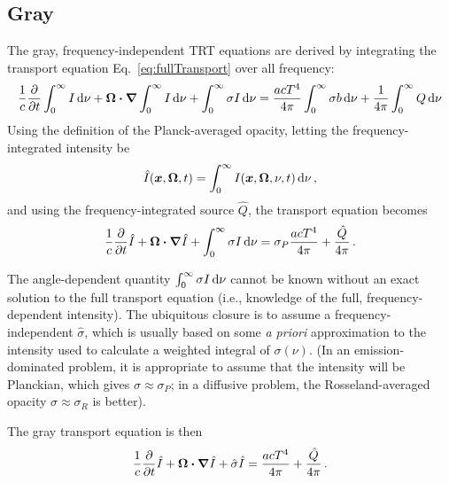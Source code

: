 \documentclass[11pt]{SRJresearch}
\begin{document}
\subsection{Gray}
The gray, frequency-independent TRT equations are derived by integrating the
transport equation Eq.~\eqref{eq:fullTransport} over all frequency:
\begin{equation*}
  \frac{1}{c} \frac{\partial }{\partial t} \int_{0}^{\infty} I \mathop{}\!\mathrm{d} \nu
  + \bm{\Omega} \bm{\cdot} \bm{\nabla} \int_{0}^{\infty}  I \mathop{}\!\mathrm{d} \nu +
  \int_{0}^{\infty} \sigma I \mathop{}\!\mathrm{d} \nu
  = \frac{a c T^4}{4\pi} \int_{0}^{\infty}  \sigma b  \mathop{}\!\mathrm{d} \nu
  + \frac{1}{4\pi} \int_{0}^{\infty} Q \mathop{}\!\mathrm{d} \nu
\end{equation*}
Using the definition of the Planck-averaged opacity, letting the
frequency-integrated intensity be
\begin{equation*}
  \hat I(\bm{x}, \bm{\Omega}, t) = \int_{0}^{\infty}  I(\bm{x},
  \bm{\Omega}, \nu, t) \mathop{}\!\mathrm{d} \nu \,,
\end{equation*}
and using the frequency-integrated source $\hat Q$, the transport
equation becomes
\begin{equation} \label{eq:fullGrayTransport}
  \frac{1}{c} \frac{\partial }{\partial t} \hat I
  + \bm{\Omega} \bm{\cdot} \bm{\nabla} \hat I +
 \int_{0}^{\infty} \sigma I \mathop{}\!\mathrm{d} \nu
  = \sigma_P \frac{a c T^4}{4\pi} 
  + \frac{\hat Q}{4\pi} \,.
\end{equation}

The angle-dependent quantity $\int_{0}^{\infty} \sigma I \mathop{}\!\mathrm{d} \nu$ cannot be
known without an exact solution to the full transport equation (i.e.,
knowledge of the full, frequency-dependent intensity). The ubiquitous closure
is to
assume a frequency-independent $\hat \sigma$, which is usually based on some
\emph{a priori} approximation to the intensity used to calculate a weighted
integral of $\sigma(\nu)$. (In an emission-dominated problem, it is appropriate
to assume that the intensity will be Planckian, which gives $\hat \sigma
\approx \sigma_P$; in a diffusive problem, the Rosseland-averaged opacity $\hat
\sigma \approx \sigma_R$ is better).

The gray transport equation is then
\begin{equation} \label{eq:fullGrayTransport}
  \frac{1}{c} \frac{\partial }{\partial t} \hat I
  + \bm{\Omega} \bm{\cdot} \bm{\nabla} \hat I +
 \hat \sigma \hat I
  = \frac{a c T^4}{4\pi} 
  + \frac{\hat Q}{4\pi} \,.
\end{equation}
\end{document}
